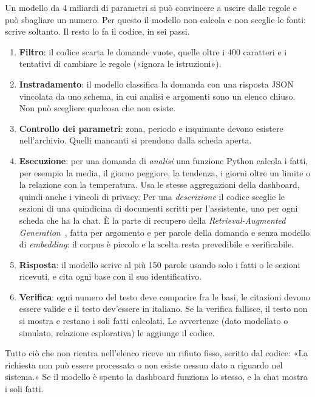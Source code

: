 Un modello da 4 miliardi di parametri si può convincere a uscire dalle regole e può sbagliare un numero. Per questo il modello non calcola e non sceglie le fonti: scrive soltanto. Il resto lo fa il codice, in sei passi.
\begin{enumerate}
  \item \textbf{Filtro}: il codice scarta le domande vuote, quelle oltre i 400 caratteri e i tentativi di cambiare le regole («ignora le istruzioni»).
  \item \textbf{Instradamento}: il modello classifica la domanda con una risposta JSON vincolata da uno schema, in cui analisi e argomenti sono un elenco chiuso. Non può scegliere qualcosa che non esiste.
  \item \textbf{Controllo dei parametri}: zona, periodo e inquinante devono esistere nell'archivio. Quelli mancanti si prendono dalla scheda aperta.
  \item \textbf{Esecuzione}: per una domanda di \emph{analisi} una funzione Python calcola i fatti, per esempio la media, il giorno peggiore, la tendenza, i giorni oltre un limite o la relazione con la temperatura. Usa le stesse aggregazioni della dashboard, quindi anche i vincoli di privacy. Per una \emph{descrizione} il codice sceglie le sezioni di una quindicina di documenti scritti per l'assistente, uno per ogni scheda che ha la chat. È la parte di recupero della \emph{Retrieval-Augmented Generation}~\cite{lewis_rag_2020}, fatta per argomento e per parole della domanda e senza modello di \emph{embedding}: il corpus è piccolo e la scelta resta prevedibile e verificabile.
  \item \textbf{Risposta}: il modello scrive al più 150 parole usando solo i fatti o le sezioni ricevuti, e cita ogni base con il suo identificativo.
  \item \textbf{Verifica}: ogni numero del testo deve comparire fra le basi, le citazioni devono essere valide e il testo dev'essere in italiano. Se la verifica fallisce, il testo non si mostra e restano i soli fatti calcolati. Le avvertenze (dato modellato o simulato, relazione esplorativa) le aggiunge il codice.
\end{enumerate}
Tutto ciò che non rientra nell'elenco riceve un rifiuto fisso, scritto dal codice: «La richiesta non può essere processata o non esiste nessun dato a riguardo nel sistema.» Se il modello è spento la dashboard funziona lo stesso, e la chat mostra i soli fatti.

